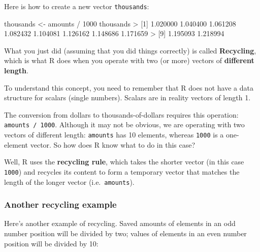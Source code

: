 \documentclass[
]{book}
\newenvironment{Shaded}{\begin{snugshade}}{\end{snugshade}}
\newcommand{\DecValTok}[1]{\textcolor[rgb]{0.00,0.00,0.81}{#1}}
\newcommand{\FloatTok}[1]{\textcolor[rgb]{0.00,0.00,0.81}{#1}}
\newcommand{\NormalTok}[1]{#1}
\newcommand{\OtherTok}[1]{\textcolor[rgb]{0.56,0.35,0.01}{#1}}
\newcommand{\SpecialCharTok}[1]{\textcolor[rgb]{0.00,0.00,0.00}{#1}}
\begin{document}
Here is how to create a new vector \texttt{thousands}:

\begin{Shaded}
\begin{Highlighting}[]
\NormalTok{thousands }\OtherTok{\textless{}{-}}\NormalTok{ amounts }\SpecialCharTok{/} \DecValTok{1000}
\NormalTok{thousands}
\SpecialCharTok{\textgreater{}}\NormalTok{  [}\DecValTok{1}\NormalTok{] }\FloatTok{1.020000} \FloatTok{1.040400} \FloatTok{1.061208} \FloatTok{1.082432} \FloatTok{1.104081} \FloatTok{1.126162} \FloatTok{1.148686} \FloatTok{1.171659}
\SpecialCharTok{\textgreater{}}\NormalTok{  [}\DecValTok{9}\NormalTok{] }\FloatTok{1.195093} \FloatTok{1.218994}
\end{Highlighting}
\end{Shaded}

What you just did (assuming that you did things correctly) is called
\textbf{Recycling}, which is what R does when you operate with two (or more) vectors
of \textbf{different length}.

To understand this concept, you need to remember that R does not have a data
structure for scalars (single numbers). Scalars are in reality vectors of
length 1.

The conversion from dollars to thousands-of-dollars requires this operation:
\texttt{amounts\ /\ 1000}. Although it may not be obvious, we are operating with two
vectors of different length: \texttt{amounts} has 10 elements, whereas \texttt{1000} is a
one-element vector. So how does R know what to do in this case?

Well, R uses the \textbf{recycling rule}, which takes the shorter vector (in this
case \texttt{1000}) and recycles its content to form a temporary vector that matches
the length of the longer vector (i.e.~\texttt{amounts}).

\hypertarget{another-recycling-example}{%
\subsubsection*{Another recycling example}\label{another-recycling-example}}

Here's another example of recycling. Saved amounts of elements in an odd
number position will be divided by two; values of elements in an even
number position will be divided by 10:
\end{document}
